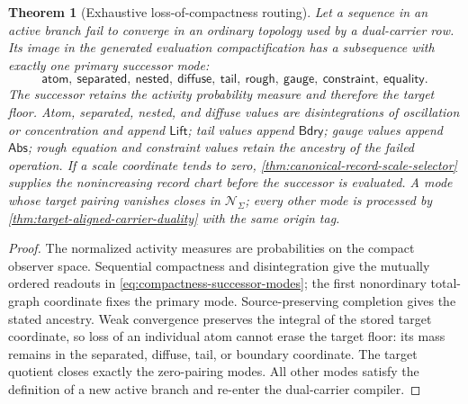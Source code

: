 \documentclass[11pt]{article}
\numberwithin{section}{part}
\theoremstyle{plain}
\newtheorem{theorem}{Theorem}[section]
\theoremstyle{definition}
\theoremstyle{remark}
\newcommand{\Abs}{\mathsf{Abs}}
\newcommand{\Lift}{\mathsf{Lift}}
\newcommand{\Bdry}{\mathsf{Bdry}}
\newcommand{\Null}{\mathscr N}
\begin{document}
\begin{theorem}[Exhaustive loss-of-compactness routing]
\label{thm:target-aligned-compactness-routing}
Let a sequence in an active branch fail to converge in an ordinary topology
used by a dual-carrier row.  Its image in the generated evaluation
compactification has a subsequence with exactly one primary successor mode:
\begin{equation}
 \label{eq:compactness-successor-modes}
 \mathsf{atom},\ \mathsf{separated},\ \mathsf{nested},\
 \mathsf{diffuse},\ \mathsf{tail},\ \mathsf{rough},\
 \mathsf{gauge},\ \mathsf{constraint},\ \mathsf{equality}.
\end{equation}
The successor retains the activity probability measure and therefore the
target floor.  Atom, separated, nested, and diffuse values are disintegrations
of oscillation or concentration and append \(\Lift\); tail values append
\(\Bdry\); gauge values append \(\Abs\); rough equation and constraint values
retain the ancestry of the failed operation.  If a scale coordinate tends to
zero, \cref{thm:canonical-record-scale-selector} supplies the nonincreasing
record chart before the successor is evaluated.  A mode whose target pairing
vanishes closes in \(\Null_\Sigma\); every other mode is processed by
\cref{thm:target-aligned-carrier-duality} with the same origin tag.
\end{theorem}

\begin{proof}
The normalized activity measures are probabilities on the compact observer
space.  Sequential compactness and disintegration give the mutually ordered
readouts in \eqref{eq:compactness-successor-modes}; the first nonordinary
total-graph coordinate fixes the primary mode.  Source-preserving completion
gives the stated ancestry.  Weak convergence preserves the integral of the
stored target coordinate, so loss of an individual atom cannot erase the
target floor: its mass remains in the separated, diffuse, tail, or boundary
coordinate.  The target quotient closes exactly the zero-pairing modes.  All
other modes satisfy the definition of a new active branch and re-enter the
dual-carrier compiler.
\end{proof}
\end{document}
